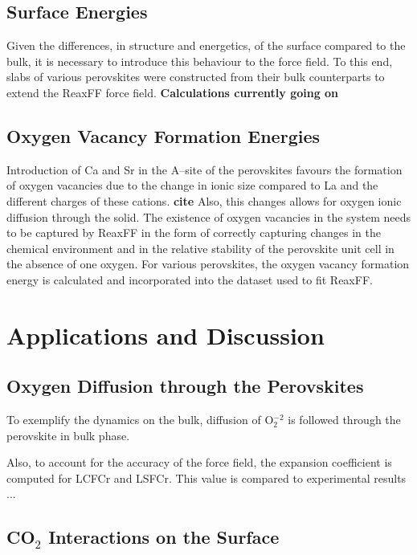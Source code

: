 \documentclass[journal=jpcafh,manuscript=article]{achemso}
\begin{document}
\subsection{Surface Energies}

Given the differences, in structure and energetics, of the surface compared to the bulk, it is necessary to introduce this behaviour to the force field.
To this end, slabs of various perovskites were constructed from their bulk counterparts to extend the ReaxFF force field.
\textbf{Calculations currently going on}

\subsection{Oxygen Vacancy Formation Energies}

Introduction of Ca and Sr in the A--site of the perovskites favours the formation of oxygen vacancies due to the change in ionic size compared to La and the different charges of these cations. \textbf{cite}
Also, this changes allows for oxygen ionic diffusion through the solid.
The existence of oxygen vacancies in the system needs to be captured by ReaxFF in the form of correctly capturing changes in the chemical environment and in the relative stability of the perovskite unit cell in the absence of one oxygen.
For various perovskites, the oxygen vacancy formation energy is calculated and incorporated into the dataset used to fit ReaxFF.

\section{Applications and Discussion}

\subsection{Oxygen Diffusion through the Perovskites}

To exemplify the dynamics on the bulk, diffusion of O$_2^{-2}$ is followed through the perovskite in bulk phase.

Also, to account for the accuracy of the force field, the expansion coefficient is computed for LCFCr and LSFCr.
This value is compared to experimental results ...

\subsection{CO$_2$ Interactions on the Surface}
\end{document}
